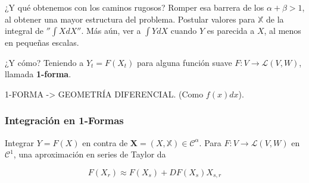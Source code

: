 ¿Y qué obtenemos con los caminos rugosos? Romper esa barrera de los $\alpha + \beta > 1$, al obtener una mayor estructura del problema. Postular valores para $\mathbb{X}$ de la integral de $''\int X dX ''$. Más aún, ver a $\int Y dX$ cuando $Y$ es parecida a $X$, al menos en pequeñas escalas.

¿Y cómo? Teniendo a $Y_t = F(X_t)$ para alguna función suave $F: V \rightarrow \mathcal{L}(V,W)$, llamada \textbf{1-forma}.


1-FORMA -> GEOMETRÍA DIFERENCIAL. (Como $f(x) dx$).

\subsubsection{Integración en 1-Formas}

Integrar $Y = F(X)$ en contra de $\mathbf{X} = (X, \mathbb{X}) \in \mathscr{C}^{\alpha}$. Para $F: V \rightarrow \mathcal{L}(V,W)$ en $\mathcal{C}^1$, una aproximación en series de Taylor da

\[
	F(X_r) \approx F(X_s) + DF(X_s) X_{s,r}
\]



